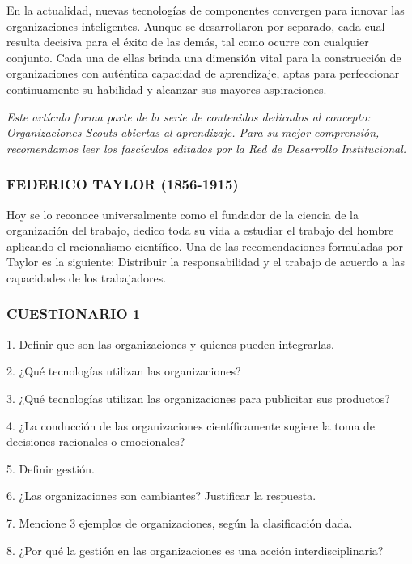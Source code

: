 En la actualidad, nuevas tecnologías de componentes convergen para innovar las organizaciones inteligentes. Aunque se desarrollaron por separado, cada cual resulta decisiva para el éxito de las demás, tal como ocurre con cualquier conjunto. Cada una de ellas brinda una dimensión vital para la construcción de organizaciones con auténtica capacidad de aprendizaje, aptas para perfeccionar continuamente su habilidad y alcanzar sus mayores aspiraciones.



\textit{Este artículo forma parte de la serie de contenidos dedicados al concepto: Organizaciones Scouts abiertas al} \textit{aprendizaje. Para su mejor comprensión, recomendamos leer los fascículos editados por la Red de Desarrollo} \textit{Institucional.}


\begin{recuadro}
\subsubsection*{FEDERICO TAYLOR (1856-1915)}
Hoy se lo reconoce universalmente como el fundador de la ciencia de la organización del trabajo, dedico toda su vida a estudiar el trabajo del hombre aplicando el racionalismo científico. Una de las recomendaciones formuladas por Taylor es la siguiente: Distribuir la responsabilidad y el trabajo de acuerdo a las capacidades de los trabajadores.
\end{recuadro}

\subsubsection*{CUESTIONARIO 1}
1. Definir que son las organizaciones y quienes pueden integrarlas.

2. ¿Qué tecnologías utilizan las organizaciones?

3. ¿Qué tecnologías utilizan las organizaciones para publicitar sus productos?

4. ¿La conducción de las organizaciones científicamente sugiere la toma de decisiones racionales o emocionales?

5. Definir gestión.

6. ¿Las organizaciones son cambiantes? Justificar la respuesta.

7. Mencione 3 ejemplos de organizaciones, según la clasificación dada.

8. ¿Por qué la gestión en las organizaciones es una acción interdisciplinaria?

